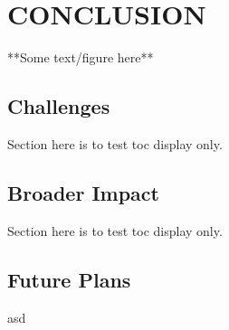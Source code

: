 %
%
%
%



\chapter{CONCLUSION \label{cha:Conclusion}}

**Some text/figure here**

\section{Challenges}
Section here is to test toc display only.

\section{Broader Impact}
Section here is to test toc display only.

\section{Future Plans}
asd